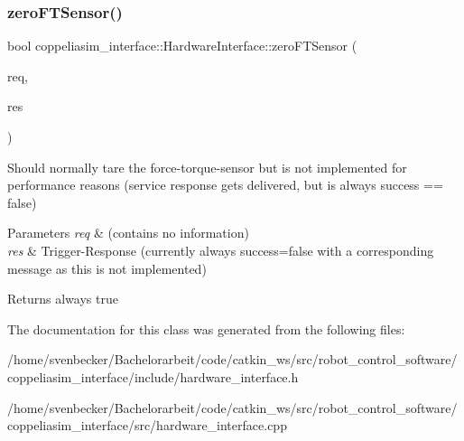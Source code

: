 \subsubsection{\texorpdfstring{zero\+F\+T\+Sensor()}{zeroFTSensor()}}
{\footnotesize\ttfamily bool coppeliasim\+\_\+interface\+::\+Hardware\+Interface\+::zero\+F\+T\+Sensor (\begin{DoxyParamCaption}\item[{std\+\_\+srvs\+::\+Trigger\+Request \&}]{req,  }\item[{std\+\_\+srvs\+::\+Trigger\+Response \&}]{res }\end{DoxyParamCaption})}



Should normally tare the force-\/torque-\/sensor but is not implemented for performance reasons (service response gets delivered, but is always \textquotesingle{}success == false\textquotesingle{}) 


\begin{DoxyParams}{Parameters}
{\em req} & (contains no information) \\
\hline
{\em res} & Trigger-\/\+Response (currently always \textquotesingle{}success=false\textquotesingle{} with a corresponding message as this is not implemented) \\
\hline
\end{DoxyParams}
\begin{DoxyReturn}{Returns}
always \textquotesingle{}true\textquotesingle{} 
\end{DoxyReturn}


The documentation for this class was generated from the following files\+:\begin{DoxyCompactItemize}
\item 
/home/svenbecker/\+Bachelorarbeit/code/catkin\+\_\+ws/src/robot\+\_\+control\+\_\+software/coppeliasim\+\_\+interface/include/hardware\+\_\+interface.\+h\item 
/home/svenbecker/\+Bachelorarbeit/code/catkin\+\_\+ws/src/robot\+\_\+control\+\_\+software/coppeliasim\+\_\+interface/src/hardware\+\_\+interface.\+cpp\end{DoxyCompactItemize}
